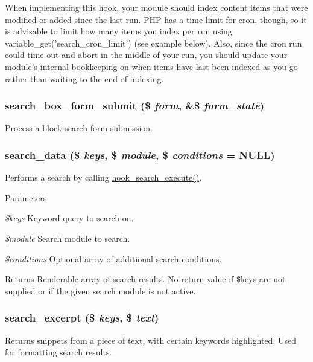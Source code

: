 When implementing this hook, your module should index content items that were modified or added since the last run. PHP has a time limit for cron, though, so it is advisable to limit how many items you index per run using variable\_\-get('search\_\-cron\_\-limit') (see example below). Also, since the cron run could time out and abort in the middle of your run, you should update your module's internal bookkeeping on when items have last been indexed as you go rather than waiting to the end of indexing. \hypertarget{group__search_gaf91fe848f7f58fc3d63001198e485e00}{
\subsubsection[{search\_\-box\_\-form\_\-submit}]{\setlength{\rightskip}{0pt plus 5cm}search\_\-box\_\-form\_\-submit (\$ {\em form}, \/  \&\$ {\em form\_\-state})}}
\label{group__search_gaf91fe848f7f58fc3d63001198e485e00}
Process a block search form submission. \hypertarget{group__search_gadc45d10981f71a4d12879254b14c2c99}{
\subsubsection[{search\_\-data}]{\setlength{\rightskip}{0pt plus 5cm}search\_\-data (\$ {\em keys}, \/  \$ {\em module}, \/  \$ {\em conditions} = {\ttfamily NULL})}}
\label{group__search_gadc45d10981f71a4d12879254b14c2c99}
Performs a search by calling \hyperlink{group__search_ga00be3e4a3b64ad73f8ad1304a450cee5}{hook\_\-search\_\-execute()}.


\begin{DoxyParams}{Parameters}
\item[{\em \$keys}]Keyword query to search on. \item[{\em \$module}]Search module to search. \item[{\em \$conditions}]Optional array of additional search conditions.\end{DoxyParams}
\begin{DoxyReturn}{Returns}
Renderable array of search results. No return value if \$keys are not supplied or if the given search module is not active. 
\end{DoxyReturn}
\hypertarget{group__search_gaa77622185b2d7ea771cf590d76ab3ba4}{
\subsubsection[{search\_\-excerpt}]{\setlength{\rightskip}{0pt plus 5cm}search\_\-excerpt (\$ {\em keys}, \/  \$ {\em text})}}
\label{group__search_gaa77622185b2d7ea771cf590d76ab3ba4}
Returns snippets from a piece of text, with certain keywords highlighted. Used for formatting search results.


